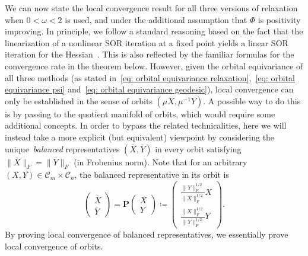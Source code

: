 \documentclass[a4paper]{article}
\newcommand{\bP}{\mathbf{P}}
\newcommand{\caC}{\mathcal{C}}
\theoremstyle{definition}
\numberwithin{equation}{section}
\begin{document}
We can now state the local convergence result for all three versions of relaxation when $0 < \omega < 2$ is used, and under the additional assumption that $\Phi$ is positivity improving. In principle, we follow a standard reasoning based on the fact that the linearization of a nonlinear SOR iteration at a fixed point yields a linear SOR iteration for the Hessian~\cite{Ortega1970}. This is also reflected by the familiar formulas for the convergence rate in the theorem below. However, given the orbital equivariance of all three methods (as stated in~\eqref{eq: orbital equivariance relaxation},~\eqref{eq: orbital equivariance psi} and~\eqref{eq: orbital equivariance geodesic}), local convergence can only be established in the sense of orbits $(\mu X, \mu^{-1} Y)$. A possible way to do this is by passing to the quotient manifold of orbits, which would require some additional concepts. In order to bypass the related technicalities, here we will instead take a more explicit (but equivalent) viewpoint by considering the unique~\emph{balanced} representatives $(\bar X,\bar Y)$ in every orbit satisfying $\| \bar X \|_F  = \| \bar Y \|_F$ (in Frobenius norm). Note that for an arbitrary $(X,Y) \in \caC_m \times \caC_n$, the balanced representative in its orbit is
\begin{equation}\label{eq: balancing map}
 \begin{pmatrix} \bar X \\ \bar Y \end{pmatrix} = \bP\!\begin{pmatrix} X \\ Y \end{pmatrix} \coloneqq \begin{pmatrix} \frac{\| Y \|_F^{1/2}}{\| X \|_F^{1/2}} X \\ \frac{\| X \|_F^{1/2}}{\| Y \|_F^{1/2}} Y \end{pmatrix}.
\end{equation}
By proving local convergence of balanced representatives, we essentially prove local convergence of orbits.
\end{document}
